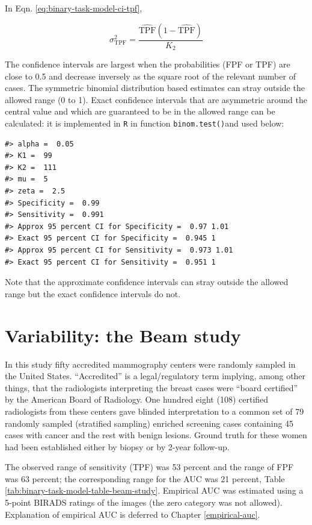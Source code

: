 \documentclass[
]{book}
\begin{document}
In Eqn. \eqref{eq:binary-task-model-ci-tpf},

\begin{equation} 
\sigma_{\text{TPF}}^2 = \frac{\widehat{\text{TPF}}\left ( 1 - \widehat{\text{TPF}} \right )}{K_2}
\label{eq:binary-task-model-var-tpf}
\end{equation}

The confidence intervals are largest when the probabilities (FPF or TPF) are close to 0.5 and decrease inversely as the square root of the relevant number of cases. The symmetric binomial distribution based estimates can stray outside the allowed range (0 to 1). Exact confidence intervals that are asymmetric around the central value and which are guaranteed to be in the allowed range can be calculated: it is implemented in \texttt{R} in function \texttt{binom.test()}and used below:

\begin{verbatim}
#> alpha =  0.05 
#> K1 =  99 
#> K2 =  111 
#> mu =  5 
#> zeta =  2.5
#> Specificity =  0.99 
#> Sensitivity =  0.991
#> Approx 95 percent CI for Specificity =  0.97 1.01
#> Exact 95 percent CI for Specificity =  0.945 1
#> Approx 95 percent CI for Sensitivity =  0.973 1.01
#> Exact 95 percent CI for Sensitivity =  0.951 1
\end{verbatim}

Note that the approximate confidence intervals can stray outside the allowed range but the exact confidence intervals do not.

\hypertarget{binary-task-model-beam-study}{%
\section{Variability: the Beam study}\label{binary-task-model-beam-study}}

In this study \citep{beam1996variability} fifty accredited mammography centers were randomly sampled in the United States. ``Accredited'' is a legal/regulatory term implying, among other things, that the radiologists interpreting the breast cases were ``board certified'' by the American Board of Radiology. One hundred eight (108) certified radiologists from these centers gave blinded interpretation to a common set of 79 randomly sampled (stratified sampling) enriched screening cases containing 45 cases with cancer and the rest with benign lesions. Ground truth for these women had been established either by biopsy or by 2-year follow-up.

The observed range of sensitivity (TPF) was 53 percent and the range of FPF was 63 percent; the corresponding range for the AUC was 21 percent, Table \ref{tab:binary-task-model-table-beam-study}. Empirical AUC was estimated using a 5-point BIRADS ratings of the images (the zero category was not allowed). Explanation of empirical AUC is deferred to Chapter \ref{empirical-auc}.
\end{document}
